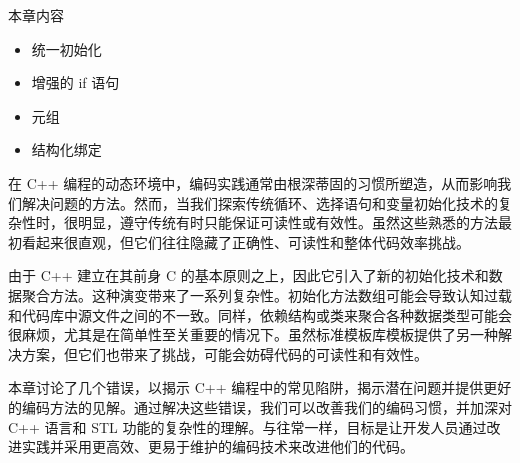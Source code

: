 本章内容

\begin{itemize}
\item
统一初始化

\item
增强的 if 语句

\item
元组

\item
结构化绑定
\end{itemize}

在 C++ 编程的动态环境中，编码实践通常由根深蒂固的习惯所塑造，从而影响我们解决问题的方法。然而，当我们探索传统循环、选择语句和变量初始化技术的复杂性时，很明显，遵守传统有时只能保证可读性或有效性。虽然这些熟悉的方法最初看起来很直观，但它们往往隐藏了正确性、可读性和整体代码效率挑战。

由于 C++ 建立在其前身 C 的基本原则之上，因此它引入了新的初始化技术和数据聚合方法。这种演变带来了一系列复杂性。初始化方法数组可能会导致认知过载和代码库中源文件之间的不一致。同样，依赖结构或类来聚合各种数据类型可能会很麻烦，尤其是在简单性至关重要的情况下。虽然标准模板库模板提供了另一种解决方案，但它们也带来了挑战，可能会妨碍代码的可读性和有效性。

本章讨论了几个错误，以揭示 C++ 编程中的常见陷阱，揭示潜在问题并提供更好的编码方法的见解。通过解决这些错误，我们可以改善我们的编码习惯，并加深对 C++ 语言和 STL 功能的复杂性的理解。与往常一样，目标是让开发人员通过改进实践并采用更高效、更易于维护的编码技术来改进他们的代码。










